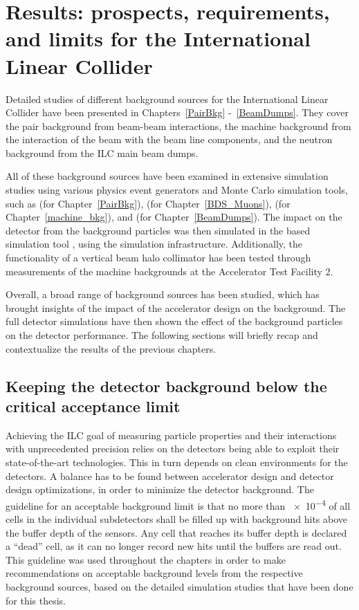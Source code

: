 \chapter{Results: prospects, requirements, and limits for the International Linear Collider}
\label{Results}
Detailed studies of different background sources for the International Linear Collider have been presented in Chapters~\ref{PairBkg} -~\ref{BeamDumps}.
They cover the \positron\electron pair background from beam-beam interactions, the machine background from the interaction of the beam with the beam line components, and the neutron background from the ILC main beam dumps.

All of these background sources have been examined in extensive simulation studies using various physics event generators and Monte Carlo simulation tools, such as \guineapig (for Chapter~\ref{PairBkg}), \mucarlo (for Chapter~\ref{BDS_Muons}), \bdsim (for Chapter~\ref{machine_bkg}), and \fluka (for Chapter~\ref{BeamDumps}).
The impact on the \sid detector from the background particles was then simulated in the \geant based simulation tool \slic, using the \sid simulation infrastructure.
Additionally, the functionality of a vertical beam halo collimator has been tested through measurements of the machine backgrounds at the Accelerator Test Facility 2.

Overall, a broad range of background sources has been studied, which has brought insights of the impact of the accelerator design on the background.
The full detector simulations have then shown the effect of the background particles on the \sid detector performance.
The following sections will briefly recap and contextualize the results of the previous chapters.

\section{Keeping the detector background below the critical acceptance limit}
Achieving the ILC goal of measuring particle properties and their interactions with unprecedented precision relies on the detectors being able to exploit their state-of-the-art technologies.
This in turn depends on clean environments for the detectors.
A balance has to be found between accelerator design and detector design optimizations, in order to minimize the detector background.
The \sid guideline for an acceptable background limit is that no more than \num{e-4} of all cells in the individual subdetectors shall be filled up with background hits above the buffer depth of the sensors.
Any cell that reaches its buffer depth is declared a ``dead'' cell, as it can no longer record new hits until the buffers are read out. 
\\This guideline was used throughout the chapters in order to make recommendations on acceptable background levels from the respective background sources, based on the detailed simulation studies that have been done for this thesis.

